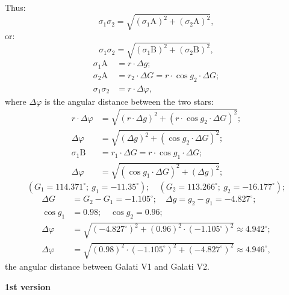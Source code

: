 Thus:
\[ \sigma_1\sigma_2 = \sqrt{(\sigma_1 \mathrm{A})^2 + (\sigma_2 \mathrm{A})^2}, \]
or:
\[ \sigma_1\sigma_2 = \sqrt{(\sigma_1 \mathrm{B})^2 + (\sigma_2 \mathrm{B})^2}, \]
\begin{align*}
\sigma_1 \mathrm{A} &= r \cdot \Delta g;\\
\sigma_2 \mathrm{A} &= r_2 \cdot \Delta G = r \cdot \cos g_2 \cdot \Delta G;\\
\sigma_1 \sigma_2 &= r \cdot \Delta\varphi,
\end{align*}
where $\Delta\varphi$ is the angular distance between the two stars:
\begin{align*}
r \cdot \Delta\varphi &= \sqrt{(r \cdot \Delta g)^2
  + (r \cdot \cos g_2 \cdot \Delta G)^2};\\
\Delta\varphi &= \sqrt{(\Delta g)^2 + (\cos g_2 \cdot \Delta G)^2};\\
\sigma_1 \mathrm{B} &= r_1 \cdot \Delta G = r \cdot \cos g_1 \cdot \Delta G;\\
\Delta\varphi &= \sqrt{(\cos g_1 \cdot \Delta G)^2 + (\Delta g)^2};
\end{align*}
\[ (G_1 = 114.371^\circ;\ g_1 = -11.35^\circ);\quad
   (G_2 = 113.266^\circ;\ g_2 = -16.177^\circ);
\]
\begin{align*}
\Delta G &= G_2 - G_1 = -1.105^\circ;\quad
  \Delta g = g_2 - g_1 = -4.827^\circ;\\
\cos g_1 &= 0.98;\quad \cos g_2 = 0.96;\\
\Delta\varphi &= \sqrt{(-4.827^\circ)^2
  + (0.96)^2\cdot(-1.105^\circ)^2} \approx 4.942^\circ;\\
\Delta\varphi &= \sqrt{(0.98)^2\cdot(-1.105^\circ)^2
  + (-4.827^\circ)^2} \approx 4.946^\circ,
\end{align*}
the angular distance between Galati V1 and Galati V2.

\textbf{1st version}

